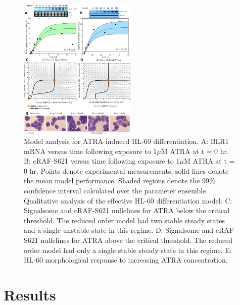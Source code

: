 \documentclass[10pt,twocolumn,twoside,final]{IEEEtran}
\begin{document}

\begin{figure}[!t]\centering
\includegraphics[width=0.50\textwidth]{./figs/Fig-2-cRaf-BLR1-Fit-Analysis.pdf}
\caption{Model analysis for ATRA-induced HL-60 differentiation.
A: BLR1 mRNA versus time following exposure to 1$\mu$M ATRA at t = 0 hr.
B: cRAF-S621 versus time following exposure to 1$\mu$M ATRA at t = 0 hr.
Points denote experimental measurements, solid lines denote the mean model performance. Shaded regions denote the 99\% confidence interval calculated over the parameter ensemble.
Qualitative analysis of the effective HL-60 differentiation model.
C: Signalsome and cRAF-S621 nullclines for ATRA below the critical threshold.
The reduced order model had two stable steady states and a single unstable state in this regime.
D: Signalsome and cRAF-S621 nullclines for ATRA above the critical threshold.
The reduced order model had only a single stable steady state in this regime.
E: HL-60 morphological response to increasing ATRA concentration. }\label{fig:model-fitting}
\end{figure}

\section{Results}
\end{document}
